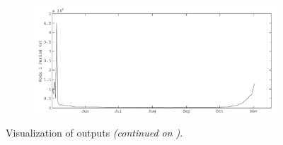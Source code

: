 \begin{figure}
\begin{subfigure}{\lafigsize}
      \includegraphics[width = \linewidth]{figures/Sparkling_ST1.pdf}
    \end{subfigure}
    \caption{\label{fig:la:outputs:1}Visualization of \la outputs \emph{(continued on )}.}
  \end{figure}
